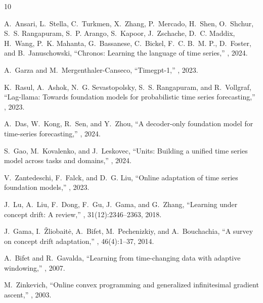 \documentclass[10pt,journal,compsoc]{IEEEtran}
\begin{document}
\begin{thebibliography}{10}

A.~Ansari, L.~Stella, C.~Turkmen, X.~Zhang, P.~Mercado, H.~Shen, O.~Shchur, S.~S. Rangapuram, S.~P. Arango, S.~Kapoor, J.~Zschache, D.~C. Maddix, H.~Wang, P.~K. Mahanta, G.~Bassanese, C.~Bickel, F.~C. B.~M. P., D.~Foster, and B.~Januschowski,
\newblock ``Chronos: Learning the language of time series,''
, 2024.

A.~Garza and M.~Mergenthaler-Canseco,
\newblock ``Timegpt-1,''
, 2023.

K.~Rasul, A.~Ashok, N.~G. Sevastopolsky, S.~S. Rangapuram, and R.~Vollgraf,
\newblock ``Lag-llama: Towards foundation models for probabilistic time series forecasting,''
, 2023.

A.~Das, W.~Kong, R.~Sen, and Y.~Zhou,
\newblock ``A decoder-only foundation model for time-series forecasting,''
, 2024.

S.~Gao, M.~Kovalenko, and J.~Leskovec,
\newblock ``Units: Building a unified time series model across tasks and domains,''
, 2024.

V.~Zantedeschi, F.~Falck, and D.~G. Liu,
\newblock ``Online adaptation of time series foundation models,''
, 2023.

J.~Lu, A.~Liu, F.~Dong, F.~Gu, J.~Gama, and G.~Zhang,
\newblock ``Learning under concept drift: A review,''
, 31(12):2346--2363, 2018.

J.~Gama, I.~{\v{Z}}liobait{\.e}, A.~Bifet, M.~Pechenizkiy, and A.~Bouchachia,
\newblock ``A survey on concept drift adaptation,''
, 46(4):1--37, 2014.

A.~Bifet and R.~Gavalda,
\newblock ``Learning from time-changing data with adaptive windowing,''
, 2007.

M.~Zinkevich,
\newblock ``Online convex programming and generalized infinitesimal gradient ascent,''
, 2003.


\end{thebibliography}
\end{document}

